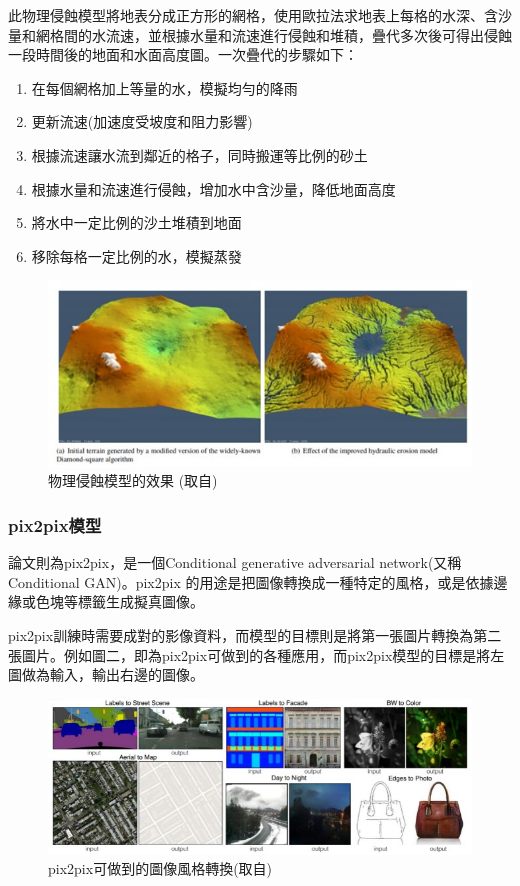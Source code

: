 \documentclass[a4paper, 12pt]{article}
\begin{document}
此物理侵蝕模型將地表分成正方形的網格，使用歐拉法求地表上每格的水深、含沙量和網格間的水流速，並根據水量和流速進行侵蝕和堆積，疊代多次後可得出侵蝕一段時間後的地面和水面高度圖。一次疊代的步驟如下：

\begin{enumerate}
    \item 在每個網格加上等量的水，模擬均勻的降雨
    \item 更新流速(加速度受坡度和阻力影響)
    \item 根據流速讓水流到鄰近的格子，同時搬運等比例的砂土
    \item 根據水量和流速進行侵蝕，增加水中含沙量，降低地面高度
    \item 將水中一定比例的沙土堆積到地面
    \item 移除每格一定比例的水，模擬蒸發
\end{enumerate}


\begin{figure}[H]
    \centering
    \includegraphics[width=\linewidth]{fig/1.jpg}
    \caption{物理侵蝕模型的效果 (取自\cite{jako2011fast})}
    \label{fig:1}
\end{figure}


\subsubsection{pix2pix模型}
論文\cite{isola2017image}則為pix2pix，是一個Conditional generative adversarial network(又稱 Conditional GAN)。pix2pix 的用途是把圖像轉換成一種特定的風格，或是依據邊緣或色塊等標籤生成擬真圖像。

pix2pix訓練時需要成對的影像資料，而模型的目標則是將第一張圖片轉換為第二張圖片。例如圖二，即為pix2pix可做到的各種應用，而pix2pix模型的目標是將左圖做為輸入，輸出右邊的圖像。

\begin{figure}[H]
    \centering
    \includegraphics[width=\linewidth]{fig/2.jpg}
    \caption{pix2pix可做到的圖像風格轉換(取自\cite{isola2017image})}
    \label{fig:2}
\end{figure}
\end{document}
